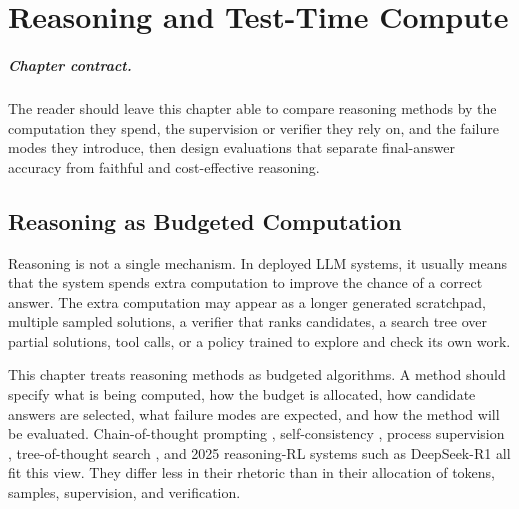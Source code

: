 \chapter{Reasoning and Test-Time Compute}
\label{ch:reasoning-test-time-compute}


\paragraph{Chapter contract.} The reader should leave this chapter able to compare reasoning methods by the computation they spend, the supervision or verifier they rely on, and the failure modes they introduce, then design evaluations that separate final-answer accuracy from faithful and cost-effective reasoning.

\section{Reasoning as Budgeted Computation}
Reasoning is not a single mechanism. In deployed LLM systems, it usually means that the system spends extra computation to improve the chance of a correct answer. The extra computation may appear as a longer generated scratchpad, multiple sampled solutions, a verifier that ranks candidates, a search tree over partial solutions, tool calls, or a policy trained to explore and check its own work.

This chapter treats reasoning methods as budgeted algorithms. A method should specify what is being computed, how the budget is allocated, how candidate answers are selected, what failure modes are expected, and how the method will be evaluated. Chain-of-thought prompting \cite{wei2022chain}, self-consistency \cite{wang2022self}, process supervision \cite{lightman2023lets}, tree-of-thought search \cite{yao2023tree}, and 2025 reasoning-RL systems such as DeepSeek-R1 \cite{deepseek2025r1} all fit this view. They differ less in their rhetoric than in their allocation of tokens, samples, supervision, and verification.

